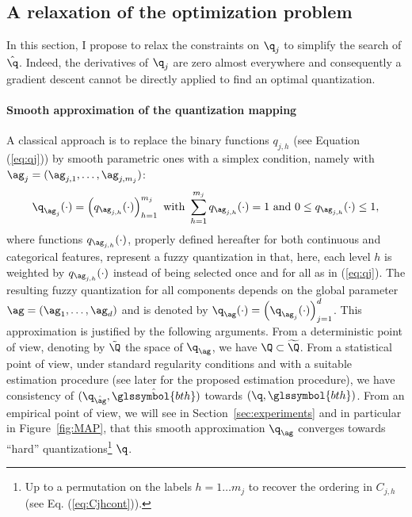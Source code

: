 \subsection{A relaxation of the optimization problem} \label{subsec:relaxation}

In this section, I propose to relax the constraints on $\q_j$ to simplify the search of $\hat{\q}$. Indeed, the derivatives of $\q_j$ are zero almost everywhere and consequently a gradient descent cannot be directly applied to find an optimal quantization.

\paragraph{Smooth approximation of the quantization mapping}

A classical approach is to replace the binary functions $q_{j,h}$ (see Equation (\ref{eq:qj}))  by smooth parametric ones  with a simplex condition, namely with $\ag_j=(\ag_{j,1},\ldots, \ag_{j,m_j})$:
\begin{equation*}
    {\q_{\ag_j}(\cdot)=\left(q_{\ag_{j,h}}(\cdot)\right)_{h=1}^{m_j} \text{ with } \sum_{h=1}^{m_j}q_{\ag_{j,h}}(\cdot)=1 \text{ and } 0 \leq q_{\ag_{j,h}}(\cdot) \leq 1,}
\end{equation*}
where functions $q_{\ag_{j,h}}(\cdot)$, properly defined hereafter for both continuous and categorical features, represent a fuzzy quantization in that, here, each level $h$ is weighted by $q_{\ag_{j,h}}(\cdot)$ instead of being selected once and for all as in (\ref{eq:qj}). The resulting fuzzy quantization for all components depends on the global parameter $\ag = (\ag_1, \ldots, \ag_d)$ and is denoted by $\q_{\ag}(\cdot)=\left(\q_{\ag_j}(\cdot)\right)_{j=1}^d$. This approximation is justified by the following arguments. From a deterministic point of view, denoting by $\tilde{\Q}$ the space of $\q_{\ag}$, we have $\Q \subset \widetilde{\Q}$. From a statistical point of view, under standard regularity conditions and with a suitable estimation procedure (see later for the proposed estimation procedure), we have consistency of $(\q_{\hat{\ag}}, \hat{\glssymbol{bth}})$ towards $(\q,\glssymbol{bth})$. From an empirical point of view, we will see in Section~\ref{sec:experiments} and in particular in Figure~\ref{fig:MAP}, that this smooth approximation $\q_{\ag}$ converges towards ``hard'' quantizations\footnote{Up to a permutation on the labels $h=1 \ldots m_j$ to recover the ordering in $C_{j,h}$ (see Eq. (\ref{eq:Cjhcont})).} $\q$.




